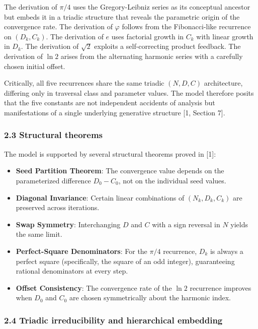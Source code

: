 \documentclass[
  11pt,
  letterpaper,
]{article}
\providecommand{\tightlist}{%
  \setlength{\itemsep}{0pt}\setlength{\parskip}{0pt}}
\begin{document}
The derivation of \(\pi/4\) uses the Gregory-Leibniz series as its
conceptual ancestor but embeds it in a triadic structure that reveals
the parametric origin of the convergence rate. The derivation of
\(\varphi\) follows from the Fibonacci-like recurrence on
\((D_k, C_k)\). The derivation of \(e\) uses factorial growth in \(C_k\)
with linear growth in \(D_k\). The derivation of \(\sqrt{2}\) exploits a
self-correcting product feedback. The derivation of \(\ln 2\) arises
from the alternating harmonic series with a carefully chosen initial
offset.

Critically, all five recurrences share the same triadic \((N, D, C)\)
architecture, differing only in traversal class and parameter values.
The model therefore posits that the five constants are not independent
accidents of analysis but manifestations of a single underlying
generative structure {[}1, Section 7{]}.

\subsubsection{2.3 Structural theorems}\label{structural-theorems}

The model is supported by several structural theorems proved in {[}1{]}:

\begin{itemize}
\tightlist
\item
  \textbf{Seed Partition Theorem}: The convergence value depends on the
  parameterized difference \(D_0 - C_0\), not on the individual seed
  values.
\item
  \textbf{Diagonal Invariance}: Certain linear combinations of
  \((N_k, D_k, C_k)\) are preserved across iterations.
\item
  \textbf{Swap Symmetry}: Interchanging \(D\) and \(C\) with a sign
  reversal in \(N\) yields the same limit.
\item
  \textbf{Perfect-Square Denominators}: For the \(\pi/4\) recurrence,
  \(D_k\) is always a perfect square (specifically, the square of an odd
  integer), guaranteeing rational denominators at every step.
\item
  \textbf{Offset Consistency}: The convergence rate of the \(\ln 2\)
  recurrence improves when \(D_0\) and \(C_0\) are chosen symmetrically
  about the harmonic index.
\end{itemize}

\subsubsection{2.4 Triadic irreducibility and hierarchical
embedding}\label{triadic-irreducibility-and-hierarchical-embedding}
\end{document}
